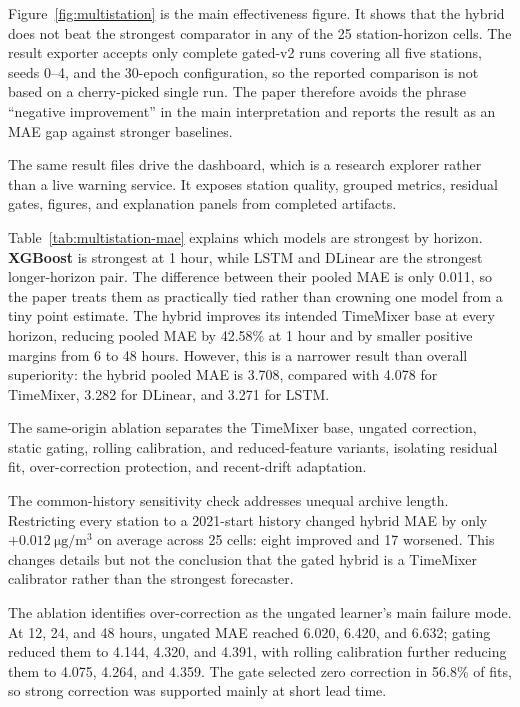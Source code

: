 \documentclass[sn-mathphys-num]{sn-jnl}
\begin{document}
Figure~\ref{fig:multistation} is the main effectiveness figure. It shows that
the hybrid does not beat the strongest comparator in any of the 25
station-horizon cells. The result exporter accepts only complete gated-v2 runs
covering all five stations, seeds 0--4, and the 30-epoch configuration, so the
reported comparison is not based on a cherry-picked single run. The paper
therefore avoids the phrase ``negative improvement'' in the main interpretation
and reports the result as an MAE gap against stronger baselines.


The same result files drive the dashboard, which is a research explorer rather
than a live warning service. It exposes station quality, grouped metrics,
residual gates, figures, and explanation panels from completed artifacts.

Table~\ref{tab:multistation-mae} explains which models are strongest by
horizon. \textbf{XGBoost} is strongest at 1 hour, while LSTM and DLinear are
the strongest longer-horizon pair. The difference between their pooled MAE is
only 0.011, so the paper treats them as practically tied rather than crowning
one model from a tiny point estimate. The hybrid improves its intended
TimeMixer base at every horizon, reducing pooled MAE by 42.58\% at 1 hour and
by smaller positive margins from 6 to 48 hours. However, this is a narrower
result than overall superiority: the hybrid pooled MAE is 3.708, compared with
4.078 for TimeMixer, 3.282 for DLinear, and 3.271 for LSTM.

The same-origin ablation separates the TimeMixer base, ungated correction,
static gating, rolling calibration, and reduced-feature variants, isolating
residual fit, over-correction protection, and recent-drift adaptation.

The common-history sensitivity check addresses unequal archive length.
Restricting every station to a 2021-start history changed hybrid MAE by only
\(+0.012~\si{\micro\gram\per\cubic\metre}\) on average across 25 cells: eight
improved and 17 worsened. This changes details but not the conclusion that the
gated hybrid is a TimeMixer calibrator rather than the strongest forecaster.

The ablation identifies over-correction as the ungated learner's main failure
mode. At 12, 24, and 48 hours, ungated MAE reached 6.020, 6.420, and 6.632;
gating reduced them to 4.144, 4.320, and 4.391, with rolling calibration
further reducing them to 4.075, 4.264, and 4.359. The gate selected zero
correction in 56.8\% of fits, so strong correction was supported mainly at short
lead time.
\end{document}
